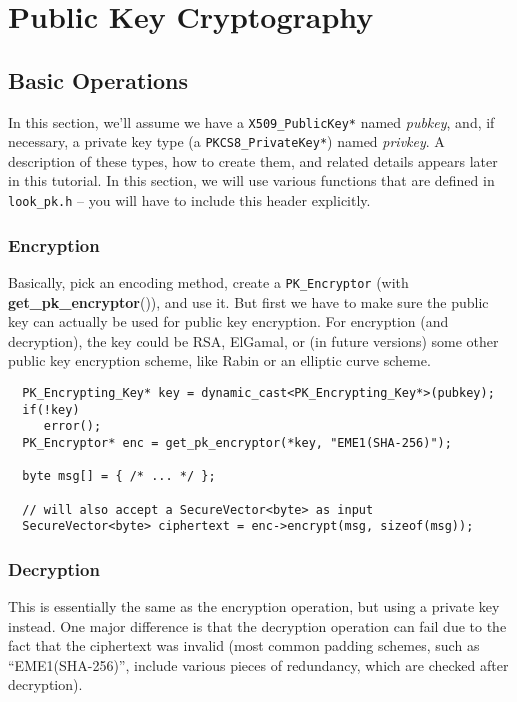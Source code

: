 \documentclass{article}
\newcommand{\filename}[1]{\texttt{#1}}
\newcommand{\function}[1]{\textbf{#1}}
\newcommand{\type}[1]{\texttt{#1}}
\renewcommand{\arg}[1]{\textsl{#1}}
\begin{document}
\pagebreak

\section{Public Key Cryptography}

\subsection{Basic Operations}

In this section, we'll assume we have a \type{X509\_PublicKey*} named
\arg{pubkey}, and, if necessary, a private key type (a
\type{PKCS8\_PrivateKey*}) named \arg{privkey}. A description of these types,
how to create them, and related details appears later in this tutorial. In this
section, we will use various functions that are defined in
\filename{look\_pk.h} -- you will have to include this header explicitly.

\subsubsection{Encryption}

Basically, pick an encoding method, create a \type{PK\_Encryptor} (with
\function{get\_pk\_encryptor}()), and use it. But first we have to make sure
the public key can actually be used for public key encryption. For encryption
(and decryption), the key could be RSA, ElGamal, or (in future versions) some
other public key encryption scheme, like Rabin or an elliptic curve scheme.

\begin{verbatim}
  PK_Encrypting_Key* key = dynamic_cast<PK_Encrypting_Key*>(pubkey);
  if(!key)
     error();
  PK_Encryptor* enc = get_pk_encryptor(*key, "EME1(SHA-256)");

  byte msg[] = { /* ... */ };

  // will also accept a SecureVector<byte> as input
  SecureVector<byte> ciphertext = enc->encrypt(msg, sizeof(msg));
\end{verbatim}

\subsubsection{Decryption}

This is essentially the same as the encryption operation, but using a private
key instead. One major difference is that the decryption operation can fail due
to the fact that the ciphertext was invalid (most common padding schemes, such
as ``EME1(SHA-256)'', include various pieces of redundancy, which are checked
after decryption).
\end{document}
